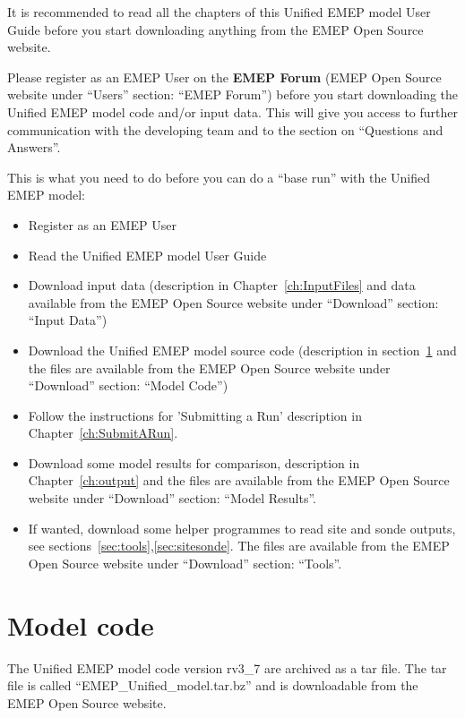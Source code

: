 It is recommended to read all the chapters of this Unified EMEP model
User Guide before you start downloading anything from the EMEP Open
Source website.

Please register as an EMEP User on the {\bf EMEP Forum}
(EMEP Open Source website under ``Users'' section: ``EMEP Forum'')
before you start downloading the Unified EMEP model code and/or input
data. This will give you access to further communication with the
developing team and to the section on ``Questions and Answers''. 


This is what you need to do before you can do a ``base run'' with the
Unified EMEP model:

\begin{itemize}
\item Register as an EMEP User
\item Read the Unified EMEP model User Guide
\item
Download input data (description in Chapter~\ref{ch:InputFiles} and
data available from the EMEP Open Source website under ``Download''
section: ``Input Data'')
\item
Download the Unified EMEP model source code (description in 
section~\ref{sec:ModelCode} and the files are available from the EMEP 
Open Source website under ``Download'' section: ``Model Code'')
\item
Follow the instructions for 'Submitting a Run' description in
Chapter~\ref{ch:SubmitARun}.
\item
Download some model results for comparison, description in
Chapter~\ref{ch:output} and the files are available from the EMEP 
Open Source website under ``Download'' section: ``Model Results''. 
\item
If wanted, download some helper programmes to read site and sonde outputs, 
see sections~\ref{sec:tools},\ref{sec:sitesonde}.
The files are available from the EMEP
Open Source website under ``Download'' section: ``Tools''.


\end{itemize}

\section{Model code}
\label{sec:ModelCode}

The Unified EMEP model code version rv3\_7 are archived as a tar file. 
The tar file is called ``EMEP\_Unified\_model.tar.bz'' and is downloadable from
the EMEP Open Source website.

